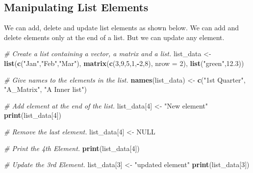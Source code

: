 \documentclass[]{book}
\newenvironment{Shaded}{\begin{snugshade}}{\end{snugshade}}
\newcommand{\CommentTok}[1]{\textcolor[rgb]{0.56,0.35,0.01}{\textit{#1}}}
\newcommand{\DataTypeTok}[1]{\textcolor[rgb]{0.13,0.29,0.53}{#1}}
\newcommand{\DecValTok}[1]{\textcolor[rgb]{0.00,0.00,0.81}{#1}}
\newcommand{\FloatTok}[1]{\textcolor[rgb]{0.00,0.00,0.81}{#1}}
\newcommand{\KeywordTok}[1]{\textcolor[rgb]{0.13,0.29,0.53}{\textbf{#1}}}
\newcommand{\NormalTok}[1]{#1}
\newcommand{\OperatorTok}[1]{\textcolor[rgb]{0.81,0.36,0.00}{\textbf{#1}}}
\newcommand{\OtherTok}[1]{\textcolor[rgb]{0.56,0.35,0.01}{#1}}
\newcommand{\StringTok}[1]{\textcolor[rgb]{0.31,0.60,0.02}{#1}}
\theoremstyle{definition}
\theoremstyle{definition}
\theoremstyle{definition}
\theoremstyle{remark}
\begin{document}
\hypertarget{manipulating-list-elements}{%
\subsection{Manipulating List
Elements}\label{manipulating-list-elements}}

We can add, delete and update list elements as shown below. We can add
and delete elements only at the end of a list. But we can update any
element.

\begin{Shaded}
\begin{Highlighting}[]
\CommentTok{# Create a list containing a vector, a matrix and a list.}
\NormalTok{list_data <-}\StringTok{ }\KeywordTok{list}\NormalTok{(}\KeywordTok{c}\NormalTok{(}\StringTok{"Jan"}\NormalTok{,}\StringTok{"Feb"}\NormalTok{,}\StringTok{"Mar"}\NormalTok{), }\KeywordTok{matrix}\NormalTok{(}\KeywordTok{c}\NormalTok{(}\DecValTok{3}\NormalTok{,}\DecValTok{9}\NormalTok{,}\DecValTok{5}\NormalTok{,}\DecValTok{1}\NormalTok{,}\OperatorTok{-}\DecValTok{2}\NormalTok{,}\DecValTok{8}\NormalTok{), }\DataTypeTok{nrow =} \DecValTok{2}\NormalTok{),}
   \KeywordTok{list}\NormalTok{(}\StringTok{"green"}\NormalTok{,}\FloatTok{12.3}\NormalTok{))}

\CommentTok{# Give names to the elements in the list.}
\KeywordTok{names}\NormalTok{(list_data) <-}\StringTok{ }\KeywordTok{c}\NormalTok{(}\StringTok{"1st Quarter"}\NormalTok{, }\StringTok{"A_Matrix"}\NormalTok{, }\StringTok{"A Inner list"}\NormalTok{)}

\CommentTok{# Add element at the end of the list.}
\NormalTok{list_data[}\DecValTok{4}\NormalTok{] <-}\StringTok{ "New element"}
\KeywordTok{print}\NormalTok{(list_data[}\DecValTok{4}\NormalTok{])}
\end{Highlighting}
\end{Shaded}

\begin{Shaded}
\begin{Highlighting}[]
\CommentTok{# Remove the last element.}
\NormalTok{list_data[}\DecValTok{4}\NormalTok{] <-}\StringTok{ }\OtherTok{NULL}

\CommentTok{# Print the 4th Element.}
\KeywordTok{print}\NormalTok{(list_data[}\DecValTok{4}\NormalTok{])}
\end{Highlighting}
\end{Shaded}

\begin{Shaded}
\begin{Highlighting}[]
\CommentTok{# Update the 3rd Element.}
\NormalTok{list_data[}\DecValTok{3}\NormalTok{] <-}\StringTok{ "updated element"}
\KeywordTok{print}\NormalTok{(list_data[}\DecValTok{3}\NormalTok{])}
\end{Highlighting}
\end{Shaded}
\end{document}
